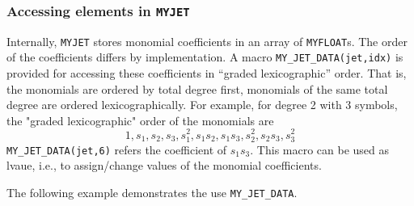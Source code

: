\documentclass[10pt]{article}
\theoremstyle{remark}
\newcommand{\myfloat}{{\tt MY\symbol{95}FLOAT}}
\newcommand{\myjet}{{\tt MY\symbol{95}JET}}
\newcommand{\inputfiles}[1]{%
\ifthenelse{\equal{#1}{sec:ex0}}{{\tt lorenz1.eq}}{%
\ifthenelse{\equal{#1}{sec:ex1}}{{\tt lorenz1.eq}}{%
\ifthenelse{\equal{#1}{sec:ex_params}}{{\tt perturbation.eq}}{%
\ifthenelse{\equal{#1}{sec:ex_lyap}}{{\tt lorenz2.eq}}{%
\ifthenelse{\equal{#1}{sec:ex_varieq}}{{\tt lorenz3.eq}}{%
\ifthenelse{\equal{#1}{sec:ex5}}{{\tt lorenz4.eq}}{%
\ifthenelse{\equal{#1}{sec:ex_omp}}{{\tt lorenz4.eq}}{%
\ifthenelse{\equal{#1}{sec:ex_equilibria}}{{\tt lorenz5.eq}}{%
\ifthenelse{\equal{#1}{sec:ex_myjetaccess}}{{\tt model.eq}}{%
\ifthenelse{\equal{#1}{sec:ex_driving}}{{\tt lorenz1.eq}}{%
ERROR!!!!!}}}}}}}}}}%
}
\newcommand{\odecfiles}[1]{%
\ifthenelse{\equal{#1}{sec:ex0}}{{\tt lorenz1.c}}{%
\ifthenelse{\equal{#1}{sec:ex1}}{{\tt lorenz1.c}}{%
\ifthenelse{\equal{#1}{sec:ex_params}}{{\tt perturbation.c}}{%
\ifthenelse{\equal{#1}{sec:ex_lyap}}{{\tt lorenz2.c}}{%
\ifthenelse{\equal{#1}{sec:ex_varieq}}{{\tt lorenz3.c}}{%
\ifthenelse{\equal{#1}{sec:ex5}}{{\tt lorenz4.c}}{%
\ifthenelse{\equal{#1}{sec:ex_omp}}{{\tt lorenz4.c}}{%
\ifthenelse{\equal{#1}{sec:ex_equilibria}}{{\tt lorenz5.c}}{%
\ifthenelse{\equal{#1}{sec:ex_myjetaccess}}{{\tt jdata.c}}{%
\ifthenelse{\equal{#1}{sec:ex_driving}}{{\tt lorenz.c}}{%
ERROR!!!!!}}}}}}}}}}%
}
\newcommand{\odehfiles}[1]{%
\ifthenelse{\equal{#1}{sec:ex0}}{{\tt taylor.h}}{%
\ifthenelse{\equal{#1}{sec:ex1}}{{\tt taylor.h}}{%
\ifthenelse{\equal{#1}{sec:ex_params}}{{\tt taylor.h}}{%
\ifthenelse{\equal{#1}{sec:ex_lyap}}{{\tt lorenz2.h}}{%
\ifthenelse{\equal{#1}{sec:ex_varieq}}{{\tt lorenz3.h}}{%
\ifthenelse{\equal{#1}{sec:ex5}}{{\tt lorenz4.h}}{%
\ifthenelse{\equal{#1}{sec:ex_omp}}{{\tt lorenz4.h}}{%
\ifthenelse{\equal{#1}{sec:ex_equilibria}}{{\tt lorenz5.h}}{%
\ifthenelse{\equal{#1}{sec:ex_myjetaccess}}{{\tt jdata.h}}{%
\ifthenelse{\equal{#1}{sec:ex_driving}}{{\tt taylor.h}}{%
ERROR!!!!!}}}}}}}}}}%
}
\newcommand{\mainfiles}[1]{%
\ifthenelse{\equal{#1}{sec:ex0}}{{\tt main\symbol{95}lrnz.c}}{%
\ifthenelse{\equal{#1}{sec:ex1}}{{\tt main\symbol{95}lrnz.c}}{%
\ifthenelse{\equal{#1}{sec:ex_params}}{{\tt main\symbol{95}params.c}}{%
\ifthenelse{\equal{#1}{sec:ex_lyap}}{{\tt main\symbol{95}lyap.c}}{%
\ifthenelse{\equal{#1}{sec:ex_varieq}}{{\tt main\symbol{95}varieq.c}}{%
\ifthenelse{\equal{#1}{sec:ex5}}{{\tt main4.c}}{%
\ifthenelse{\equal{#1}{sec:ex_omp}}{{\tt main\symbol{95}omp.c}}{%
\ifthenelse{\equal{#1}{sec:ex_equilibria}}{{\tt main\symbol{95}equilibria.c}}{%
\ifthenelse{\equal{#1}{sec:ex_myjetaccess}}{{\tt jdata\symbol{95}main.c}}{%
ERROR!!!!!}}}}}}}}}%
}
\newcommand{\inputfile}{}
\newcommand{\mainfile}{}
\newcommand{\odecfile}{}
\newcommand{\odehfile}{}
\begin{document}
\subsubsection*{Accessing elements in \myjet{}} \label{sec:ex_myjetaccess}
\renewcommand{\inputfile}{\inputfiles{sec:ex_myjetaccess}}
\renewcommand{\odecfile}{\odecfiles{sec:ex_myjetaccess}}
\renewcommand{\odehfile}{\odehfiles{sec:ex_myjetaccess}}
\renewcommand{\mainfile}{\mainfiles{sec:ex_myjetaccess}}

Internally, \myjet{} stores monomial coefficients in an array of
\myfloat{}s. The order of the coefficients differs by
implementation. A macro \verb+MY_JET_DATA(jet,idx)+ is provided for
accessing these coefficients in ``graded lexicographic'' order.  That
is, the monomials are ordered by total degree first, monomials of the
same total degree are ordered lexicographically.  For example, for
degree 2 with 3 symbols, the "graded lexicographic" order of the
monomials are
\[
1, s_1, s_2, s_3, s_1^2, s_1s_2, s_1s_3, s_2^2, s_2s_3, s_3^2
\]
\verb+MY_JET_DATA(jet,6)+ refers the coefficient of $s_1s_3$.  This
macro can be used as lvaue, i.e., to assign/change values of the
monomial coefficients.

\vspace{4mm}

The following example demonstrates the use \verb+MY_JET_DATA+.
\end{document}

